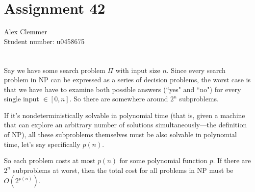 \documentclass[a4paper]{article}
\begin{document}
\section*{Assignment 42}
Alex Clemmer\\
Student number: u0458675

\section{}

Say we have some search problem $\Pi$ with input size $n$. Since every search problem in NP can be expressed as a series of decision problems, the worst case is that we have have to examine both possible answers (``yes" and ``no") for every single input $\in [0,n]$. So there are somewhere around $2^n$ subproblems.

If it's nondeterministically solvable in polynomial time (that is, given a machine that can explore an arbitrary number of solutions simultaneously---the definition of NP), all these subproblems themselves must be also solvable in polynomial time, let's say specifically $p(n)$.

So each problem costs at most $p(n)$ for some polynomial function $p$. If there are $2^n$ subproblems at worst, then the total cost for all problems in NP must be $O(2^{p(n)})$.
\end{document}
